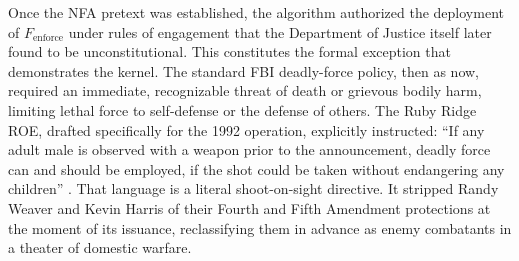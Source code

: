 Once the NFA pretext was established, the algorithm authorized the deployment of $F_{\text{enforce}}$ under rules of engagement that the Department of Justice itself later found to be unconstitutional. This constitutes the formal exception that demonstrates the kernel. The standard FBI deadly-force policy, then as now, required an immediate, recognizable threat of death or grievous bodily harm, limiting lethal force to self-defense or the defense of others. The Ruby Ridge ROE, drafted specifically for the 1992 operation, explicitly instructed: ``If any adult male is observed with a weapon prior to the announcement, deadly force can and should be employed, if the shot could be taken without endangering any children'' \cite{dojruby1994, oprruby2001}. That language is a literal shoot-on-sight directive. It stripped Randy Weaver and Kevin Harris of their Fourth and Fifth Amendment protections at the moment of its issuance, reclassifying them in advance as enemy combatants in a theater of domestic warfare.

